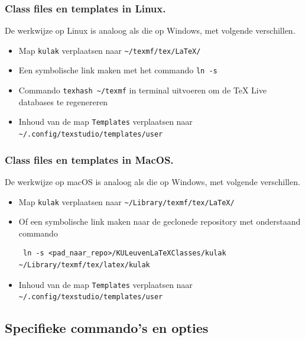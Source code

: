 \documentclass[kulak]{kulakarticle} %
\begin{document}
\subsubsection{Class files en templates in Linux.}
\label{sssec:linux}

De werkwijze op Linux is analoog als die op Windows, met volgende verschillen.

\begin{itemize}
	\item Map \texttt{kulak} verplaatsen naar \verb+~/texmf/tex/LaTeX/+
	\item Een symbolische link maken met het commando \texttt{ln -s }
	\item Commando \verb+texhash ~/texmf+ in terminal uitvoeren om de TeX Live databases te regenereren
	\item Inhoud van de map \texttt{Templates} verplaatsen naar \verb+~/.config/texstudio/templates/user+
\end{itemize}

\subsubsection{Class files en templates in MacOS.}
\label{sssec:macos}

De werkwijze op macOS is analoog als die op Windows, met volgende verschillen.
\begin{itemize}
	\item Map \texttt{kulak} verplaatsen naar \verb+~/Library/texmf/tex/LaTeX/+
	\item Of een symbolische link maken naar de geclonede repository met onderstaand commando
	      \begin{verbatim} ln -s <pad_naar_repo>/KULeuvenLaTeXClasses/kulak ~/Library/texmf/tex/latex/kulak\end{verbatim}
	\item Inhoud van de map \texttt{Templates} verplaatsen naar \verb+~/.config/texstudio/templates/user+
\end{itemize}

\subsection{Specifieke commando's en opties}
\end{document}
